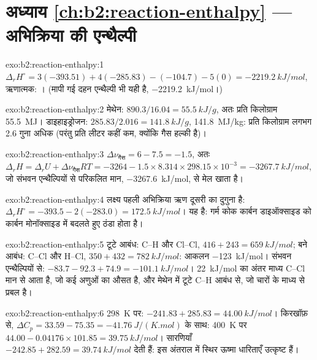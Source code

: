 \section*{अध्याय \ref{ch:b2:reaction-enthalpy} --- अभिक्रिया की एन्थैल्पी}

\begin{solution}{exo:b2:reaction-enthalpy:1}
$\Delta_r H^\circ = 3(-393.51) + 4(-285.83) - (-104.7) - 5(0) =
\qty{-2219.2}{kJ/mol}$, ऋणात्मक: । (मापी गई दहन
एन्थैल्पी भी यही है, \qty{-2219.2}{kJ/mol}।)
\end{solution}

\begin{solution}{exo:b2:reaction-enthalpy:2}
मेथेन: $890.3/16.04 = \qty{55.5}{kJ/g}$, अतः प्रति किलोग्राम \qty{55.5}{MJ}।
डाइहाइड्रोजन: $285.83/2.016 = \qty{141.8}{kJ/g}$,
\qty{141.8}{MJ/kg}: प्रति किलोग्राम लगभग 2.6 गुना अधिक (परंतु प्रति
लीटर कहीं कम, क्योंकि गैस हल्की है)।
\end{solution}

\begin{solution}{exo:b2:reaction-enthalpy:3}
$\Delta\nu_{\text{गैस}} = 6 - 7.5 = -1.5$, अतः $\Delta_r H = \Delta_r U +
\Delta\nu_{\text{गैस}}RT = -3264 - 1.5 \times 8.314 \times 298.15 \times
10^{-3} = \qty{-3267.7}{kJ/mol}$, जो संभवन एन्थैल्पियों से परिकलित मान,
\qty{-3267.6}{kJ/mol}, से मेल खाता है।
\end{solution}

\begin{solution}{exo:b2:reaction-enthalpy:4}
लक्ष्य पहली अभिक्रिया ऋण दूसरी का दुगुना है:
$\Delta_r H^\circ = -393.5 - 2(-283.0) = \qty{+172.5}{kJ/mol}$। यह
 है: गर्म कोक कार्बन डाइऑक्साइड को कार्बन मोनॉक्साइड में
बदलते हुए ठंडा होता है।
\end{solution}

\begin{solution}{exo:b2:reaction-enthalpy:5}
टूटे आबंध: C--H और Cl--Cl, $416 + 243 = \qty{659}{kJ/mol}$; बने
आबंध: C--Cl और H--Cl, $350 + 432 = \qty{782}{kJ/mol}$: आकलन
\qty{-123}{kJ/mol}। संभवन एन्थैल्पियों से: $-83.7 - 92.3 + 74.9 =
\qty{-101.1}{kJ/mol}$। \qty{22}{kJ/mol} का अंतर माध्य C--Cl
मान से आता है, जो कई अणुओं का औसत है, और मेथेन में टूटे C--H आबंध से,
जो चारों के माध्य से प्रबल है।
\end{solution}

\begin{solution}{exo:b2:reaction-enthalpy:6}
\qty{298}{K} पर: $-241.83 + 285.83 = \qty{44.00}{kJ/mol}$। किरखॉफ़ से,
$\Delta C_p = 33.59 - 75.35 = \qty{-41.76}{J/(K.mol)}$ के साथ:
\qty{400}{K} पर $44.00 - 0.04176 \times 101.85 = \qty{39.75}{kJ/mol}$। सारणियाँ
$-242.85 + 282.59 = \qty{39.74}{kJ/mol}$ देती हैं: इस अंतराल में स्थिर ऊष्मा
धारिताएँ उत्कृष्ट हैं।
\end{solution}

